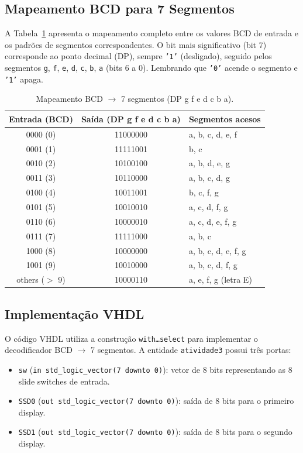 \documentclass[12pt,a4paper, brazil]{article}
\begin{document}
\subsection{Mapeamento BCD para 7 Segmentos}

A Tabela~\ref{tab:bcd-ssd} apresenta o mapeamento completo entre os valores BCD de entrada e os padrões de segmentos correspondentes. O bit mais significativo (bit 7) corresponde ao ponto decimal (DP), sempre \texttt{'1'} (desligado), seguido pelos segmentos \texttt{g}, \texttt{f}, \texttt{e}, \texttt{d}, \texttt{c}, \texttt{b}, \texttt{a} (bits 6 a 0). Lembrando que \texttt{'0'} acende o segmento e \texttt{'1'} apaga.

\begin{table}[H]
\centering
\caption{Mapeamento BCD $\rightarrow$ 7 segmentos (DP g f e d c b a).}
\label{tab:bcd-ssd}
\begin{tabular}{@{}ccl@{}}
\toprule
\textbf{Entrada (BCD)} & \textbf{Saída (DP g f e d c b a)} & \textbf{Segmentos acesos} \\
\midrule
0000 (0) & 11000000 & a, b, c, d, e, f \\
0001 (1) & 11111001 & b, c \\
0010 (2) & 10100100 & a, b, d, e, g \\
0011 (3) & 10110000 & a, b, c, d, g \\
0100 (4) & 10011001 & b, c, f, g \\
0101 (5) & 10010010 & a, c, d, f, g \\
0110 (6) & 10000010 & a, c, d, e, f, g \\
0111 (7) & 11111000 & a, b, c \\
1000 (8) & 10000000 & a, b, c, d, e, f, g \\
1001 (9) & 10010000 & a, b, c, d, f, g \\
\midrule
others ($>$ 9) & 10000110 & a, e, f, g (letra E) \\
\bottomrule
\end{tabular}
\end{table}
\FloatBarrier

\subsection{Implementação VHDL}

O código VHDL utiliza a construção \texttt{with\ldots select} para implementar o decodificador BCD $\rightarrow$ 7 segmentos. A entidade \texttt{atividade3} possui três portas:

\begin{itemize}
    \item \texttt{sw} (\texttt{in std\_logic\_vector(7 downto 0)}): vetor de 8 bits representando as 8 slide switches de entrada.
    \item \texttt{SSD0} (\texttt{out std\_logic\_vector(7 downto 0)}): saída de 8 bits para o primeiro display.
    \item \texttt{SSD1} (\texttt{out std\_logic\_vector(7 downto 0)}): saída de 8 bits para o segundo display.
\end{itemize}
\end{document}
